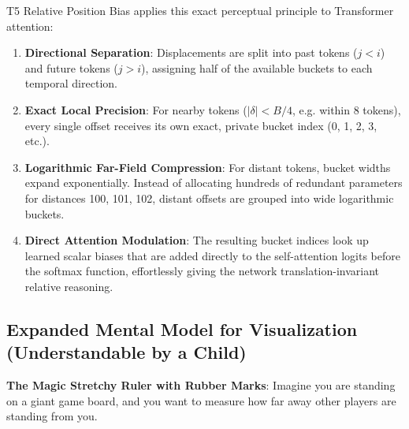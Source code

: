 \documentclass[11pt,a4paper]{article}
\theoremstyle{definition}
\begin{document}
T5 Relative Position Bias applies this exact perceptual principle to Transformer attention:
\begin{enumerate}
    \item \textbf{Directional Separation}: Displacements are split into past tokens ($j < i$) and future tokens ($j > i$), assigning half of the available buckets to each temporal direction.
    \item \textbf{Exact Local Precision}: For nearby tokens ($|\delta| < B/4$, e.g. within 8 tokens), every single offset receives its own exact, private bucket index (0, 1, 2, 3, etc.).
    \item \textbf{Logarithmic Far-Field Compression}: For distant tokens, bucket widths expand exponentially. Instead of allocating hundreds of redundant parameters for distances 100, 101, 102, distant offsets are grouped into wide logarithmic buckets.
    \item \textbf{Direct Attention Modulation}: The resulting bucket indices look up learned scalar biases that are added directly to the self-attention logits before the softmax function, effortlessly giving the network translation-invariant relative reasoning.
\end{enumerate}

\subsection{Expanded Mental Model for Visualization (Understandable by a Child)}
\textbf{The Magic Stretchy Ruler with Rubber Marks}:
Imagine you are standing on a giant game board, and you want to measure how far away other players are standing from you.
\end{document}
